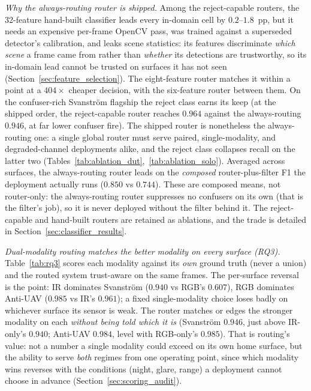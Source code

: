 \emph{Why the always-routing router is shipped.} Among the reject-capable routers, the 32-feature hand-built classifier leads every in-domain cell by $0.2$--$1.8$~pp, but it needs an expensive per-frame OpenCV pass, was trained against a superseded detector's calibration, and leaks scene statistics: its features discriminate \emph{which scene} a frame came from rather than \emph{whether} its detections are trustworthy, so its in-domain lead cannot be trusted on surfaces it has not seen (Section~\ref{sec:feature_selection}). The eight-feature router matches it within a point at a $404\times$ cheaper decision, with the six-feature router between them. On the confuser-rich Svanstr\"om flagship the reject class earns its keep (at the shipped order, the reject-capable router reaches $0.964$ against the always-routing $0.946$, at far lower confuser fire). The shipped router is nonetheless the always-routing one: a single global router must serve paired, single-modality, and degraded-channel deployments alike, and the reject class collapses recall on the latter two (Tables~\ref{tab:ablation_dut},~\ref{tab:ablation_solo}). Averaged across surfaces, the always-routing router leads on the \emph{composed} router-plus-filter F1 the deployment actually runs ($0.850$ vs $0.744$). These are composed means, not router-only: the always-routing router suppresses no confusers on its own (that is the filter's job), so it is never deployed without the filter behind it. The reject-capable and hand-built routers are retained as ablations, and the trade is detailed in Section~\ref{sec:classifier_results}.

\emph{Dual-modality routing matches the better modality on every surface (RQ3).} Table~\ref{tab:rq3} scores each modality against its \emph{own} ground truth (never a union) and the routed system trust-aware on the same frames. The per-surface reversal is the point: IR dominates Svanstr\"om ($0.940$ vs RGB's $0.607$), RGB dominates Anti-UAV ($0.985$ vs IR's $0.961$); a fixed single-modality choice loses badly on whichever surface its sensor is weak. The router matches or edges the stronger modality on each \emph{without being told which it is} (Svanstr\"om $0.946$, just above IR-only's $0.940$; Anti-UAV $0.984$, level with RGB-only's $0.985$). That is routing's value: not a number a single modality could exceed on its own home surface, but the ability to serve \emph{both} regimes from one operating point, since which modality wins reverses with the conditions (night, glare, range) a deployment cannot choose in advance (Section~\ref{sec:scoring_audit}).

